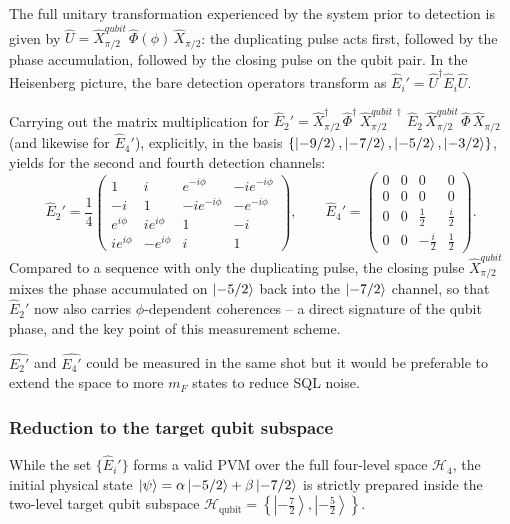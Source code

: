 The full unitary transformation experienced by the system prior to detection is given by $\hat{U} = \hat{X}^{qubit}_{\pi/2}\, \hat{\Phi}(\phi)\, \hat{X}_{\pi/2}$: the duplicating pulse acts first, followed by the phase accumulation, followed by the closing pulse on the qubit pair. In the Heisenberg picture, the bare detection operators transform as $\hat{E}_i' = \hat{U}^\dagger \hat{E}_i \hat{U}$.

Carrying out the matrix multiplication for $\hat{E}_2' = \hat{X}_{\pi/2}^\dagger\, \hat{\Phi}^\dagger\, \hat{X}^{qubit\,\dagger}_{\pi/2}\, \hat{E}_2\, \hat{X}^{qubit}_{\pi/2}\, \hat{\Phi}\, \hat{X}_{\pi/2}$ (and likewise for $\hat{E}_4'$), explicitly, in the basis \linebreak
$\left\{\ket{-9/2}, \ket{-7/2}, \ket{-5/2}, \ket{-3/2}\right\}$, yields for the second and fourth detection channels:
\begin{equation}
    \hat{E}_2' = \frac{1}{4}\begin{pmatrix}
    1 & i & e^{-i\phi} & -ie^{-i\phi} \\
    -i & 1 & -ie^{-i\phi} & -e^{-i\phi} \\
    e^{i\phi} & ie^{i\phi} & 1 & -i \\
    ie^{i\phi} & -e^{i\phi} & i & 1
    \end{pmatrix}, \qquad
    \hat{E}_4' = \begin{pmatrix}
    0&0&0&0\\
    0&0&0&0\\
    0&0&\frac{1}{2}&\frac{i}{2}\\
    0&0&-\frac{i}{2}&\frac{1}{2}
    \end{pmatrix}.
\end{equation}
Compared to a sequence with only the duplicating pulse, the closing pulse $\hat{X}^{qubit}_{\pi/2}$ mixes the phase accumulated on $\ket{-5/2}$ back into the $\ket{-7/2}$ channel, so that $\hat{E}_2'$ now also carries $\phi$-dependent coherences -- a direct signature of the qubit phase, and the key point of this measurement scheme.

$\hat{E_2'}$ and $\hat{E_4'}$ could be measured in the same shot but it would be preferable to extend the space to more $m_F$ states 
to reduce SQL noise.

\subsubsection{Reduction to the target qubit subspace}

While the set $\{\hat{E}_i'\}$ forms a valid PVM over the full four-level space $\mathcal{H}_4$, the initial physical state $\ket{\psi} = \alpha \ket{-5/2} + \beta \ket{-7/2}$ is strictly prepared inside the two-level target qubit subspace $\mathcal{H}_{\text{qubit}} = \left\{\left|-\frac{7}{2}\right\rangle, \left|-\frac{5}{2}\right\rangle\right\}$.

